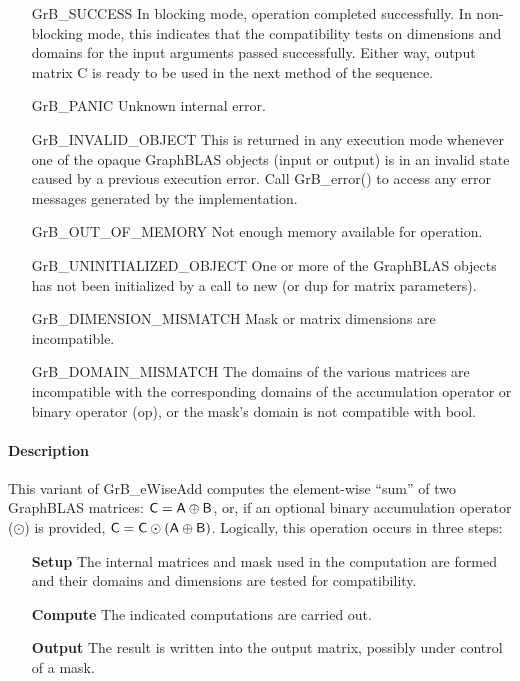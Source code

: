 \begin{itemize}[leftmargin=2.1in]
    \item[{\sf GrB\_SUCCESS}]         In blocking mode, operation
	completed successfully. In non-blocking mode, this indicates
	that the compatibility tests on dimensions and domains for the
	input arguments passed successfully. Either way, output matrix
	{\sf C} is ready to be used in the next method of the sequence.

    \item[{\sf GrB\_PANIC}]           Unknown internal error.
    
    \item[{\sf GrB\_INVALID\_OBJECT}] This is returned in any execution mode 
    whenever one of the opaque GraphBLAS objects (input or output) is in an invalid 
    state caused by a previous execution error.  Call {\sf GrB\_error()} to access 
    any error messages generated by the implementation.

    \item[{\sf GrB\_OUT\_OF\_MEMORY}]        Not enough memory available for operation.
    
    \item[{\sf GrB\_UNINITIALIZED\_OBJECT}] One or more of the GraphBLAS objects 
    has not been initialized by a call to {\sf new} (or {\sf dup} for matrix
    parameters).

    \item[{\sf GrB\_DIMENSION\_MISMATCH}] Mask or matrix dimensions are incompatible.

	\item[{\sf GrB\_DOMAIN\_MISMATCH}]    The domains of the various
	matrices are incompatible with the corresponding domains of the
	accumulation operator or binary operator ({\sf op}), or the mask's domain 
    is not compatible with {\sf bool}.
\end{itemize}

\paragraph{Description}

This variant of {\sf GrB\_eWiseAdd } computes the element-wise ``sum'' of
two GraphBLAS matrices: ${\sf C} = {\sf A} \oplus {\sf B}$, or, if an optional
binary accumulation operator ($\odot$) is provided, ${\sf C} = {\sf C} \odot
\left({\sf A} \oplus {\sf B}\right)$.  Logically, this operation occurs in
three steps:
\begin{enumerate}[leftmargin=0.75in]
\item[\bf Setup] The internal matrices and mask used in the computation are formed 
and their domains and dimensions are tested for compatibility.
\item[\bf Compute] The indicated computations are carried out.
\item[\bf Output] The result is written into the output matrix, possibly under 
control of a mask.
\end{enumerate}

